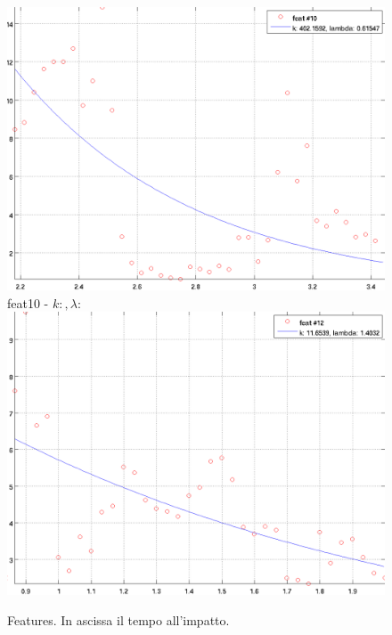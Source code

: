 \documentclass[12pt]{report}
\begin{document}
\begin{figure}
\begin{minipage}[t]{0.5\linewidth}
	\includegraphics[scale=\imFeatScale, angle=\imFeatAngle]{images/feat10}\\
	feat10 - $k: , \lambda:  $\\
	\includegraphics[scale=\imFeatScale, angle=\imFeatAngle]{images/feat12}\\
\end{minipage}
\caption[short]{Features. In ascissa il tempo all'impatto.}
\label{fig:feats2}
\end{figure}
\end{document}

